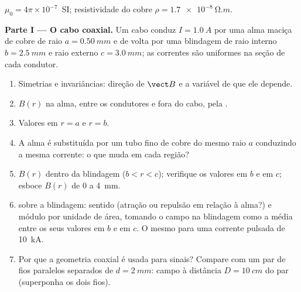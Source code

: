 \begin{problem}
\label{pb:b1:magnetostatics:1}
$\mu_0 = 4\pi \times 10^{-7}$~SI; resistividade do cobre $\rho = \qty{1.7e-8}{\ohm.m}$.

\medskip
\noindent\textbf{Parte I --- O cabo coaxial.}
Um cabo conduz $I = \qty{1.0}{A}$ por uma alma maciça de cobre de raio
$a = \qty{0.50}{mm}$ e de volta por uma blindagem de raio interno $b =
\qty{2.5}{mm}$ e raio externo $c = \qty{3.0}{mm}$; as correntes são uniformes
na seção de cada condutor.
\begin{enumerate}
  \item Simetrias e invariâncias: direção de $\vect B$ e a
        variável de que ele depende.
  \item $B(r)$ na alma, entre os condutores e fora do
        cabo, pela .
  \item Valores em $r = a$ e $r = b$.
  \item A alma é substituída por um tubo fino de cobre do mesmo raio
        $a$ conduzindo a mesma corrente: o que muda em cada região?
  \item $B(r)$ dentro da blindagem ($b < r < c$); verifique os valores em $b$
        e em $c$; esboce $B(r)$ de $0$ a \qty{4}{mm}.
  \item {} sobre a blindagem: sentido (atração ou
        repulsão em relação à alma?) e módulo por unidade de área, tomando o
        campo na blindagem como a média entre os seus valores em $b$ e em $c$.
        O mesmo para uma corrente pulsada de \qty{10}{kA}.
  \item Por que a geometria coaxial é usada para sinais? Compare com um
        par de fios paralelos separados de $d = \qty{2}{mm}$: campo à distância
        $D = \qty{10}{cm}$ do par (superponha os dois fios).
\end{enumerate}


\end{problem}
